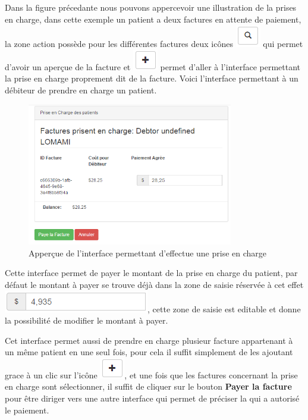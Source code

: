 \documentclass[12pt,a4paper]{report}
\begin{document}
Dans la figure précedante nous pouvons appercevoir une illustration de la prises en charge, dans cette exemple un patient a deux factures en attente de paiement, la zone action possède pour les différentes factures deux icônes \includegraphics[scale=0.7]{pic/LoopBlack.png} qui permet d'avoir un aperçue de la facture et \includegraphics[scale=0.7]{pic/plusBlack.png} permet d'aller à l'interface permettant la prise en charge proprement dit de la facture. 
Voici l'interface permettant à un débiteur de prendre en charge un patient.

\begin{figure}[h]
\begin{center}
\includegraphics[width=9cm]{pic/SupportPatient.png}
\end{center}
\caption{Apperçue de l'interface permettant d'effectue une prise en charge}
\label{Apperçue de l'interface permettant d'effectue une prise en charge}
\end{figure}


Cette interface permet de payer le montant de la prise en charge du patient, par défaut le montant à payer se trouve déjà dans la zone de saisie réservée à cet effet \includegraphics[scale=0.7]{pic/editableDeb.png}, cette zone de saisie est editable et donne la possibilité de modifier le montant à payer. 

Cet interface permet aussi de prendre en charge plusieur facture appartenant à un même patient en une seul fois, pour cela il suffit simplement de les ajoutant grace à un clic sur l'icône \includegraphics[scale=0.7]{pic/plusBlack.png}, et une fois que les factures concernant la prise en charge sont sélectionner, il suffit de cliquer sur le bouton \textbf{Payer la facture} pour être diriger vers une autre interface qui permet de préciser la qui a autorisé le paiement.
\end{document}
